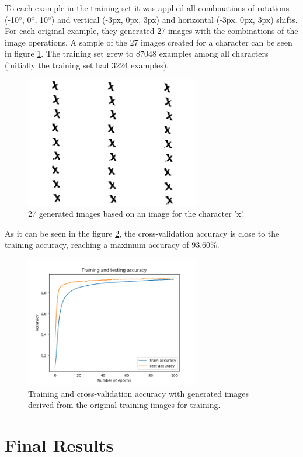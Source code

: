 \documentclass[journal]{IEEEtran}
\begin{document}
To each example in the training set it was applied all combinations of rotations (-10º, 0º, 10º) and vertical (-3px, 0px, 3px) and horizontal (-3px, 0px, 3px) shifts. For each original example, they generated 27 images with the combinations of the image operations. A sample of the 27 images created for a character can be seen in figure \ref{generated_images}. The training set grew to 87048 examples among all characters (initially the training set had 3224 examples).

\begin{figure}[!t]
\centering
\includegraphics[width=3in]{images/generated_images}
\caption{27 generated images based on an image for the character 'x'.}
\label{generated_images}
\end{figure}

As it can be seen in the figure \ref{results_8}, the cross-validation accuracy is close to the training accuracy, reaching a maximum accuracy of 93.60\%.

\begin{figure}[!t]
\centering
\includegraphics[width=3in]{images/test_8}
\caption{Training and cross-validation accuracy with generated images derived from the original training images for training.}
\label{results_8}
\end{figure}


\section{Final Results}
\end{document}
